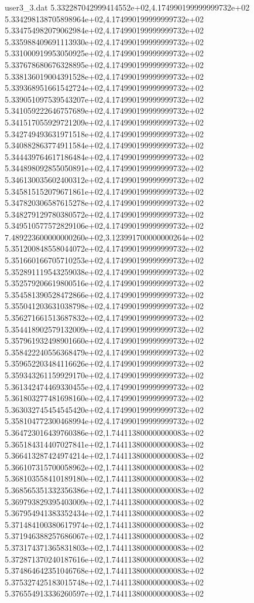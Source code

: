 \begin{filecontents}{user3_3.dat}
5.332287042999414552e+02,4.174990199999999732e+02
5.334298138705898964e+02,4.174990199999999732e+02
5.334754982079062984e+02,4.174990199999999732e+02
5.335988409691113930e+02,4.174990199999999732e+02
5.331000919953050925e+02,4.174990199999999732e+02
5.337678680676328895e+02,4.174990199999999732e+02
5.338136019004391528e+02,4.174990199999999732e+02
5.339368951661542724e+02,4.174990199999999732e+02
5.339051097539543207e+02,4.174990199999999732e+02
5.341059222646757689e+02,4.174990199999999732e+02
5.341517055929721209e+02,4.174990199999999732e+02
5.342749493631971518e+02,4.174990199999999732e+02
5.340882863774911584e+02,4.174990199999999732e+02
5.344439764617186484e+02,4.174990199999999732e+02
5.344898092855050891e+02,4.174990199999999732e+02
5.346130035602400312e+02,4.174990199999999732e+02
5.345815152079671861e+02,4.174990199999999732e+02
5.347820306587615278e+02,4.174990199999999732e+02
5.348279129780380572e+02,4.174990199999999732e+02
5.349510577572829106e+02,4.174990199999999732e+02
7.489223600000000260e+02,3.123991700000000264e+02
5.351200848558044072e+02,4.174990199999999732e+02
5.351660166705710253e+02,4.174990199999999732e+02
5.352891119543259038e+02,4.174990199999999732e+02
5.352579206619800516e+02,4.174990199999999732e+02
5.354581390528472866e+02,4.174990199999999732e+02
5.355041203631038798e+02,4.174990199999999732e+02
5.356271661513687832e+02,4.174990199999999732e+02
5.354418902579132009e+02,4.174990199999999732e+02
5.357961932498901660e+02,4.174990199999999732e+02
5.358422240556368479e+02,4.174990199999999732e+02
5.359652203484116626e+02,4.174990199999999732e+02
5.359343261159929170e+02,4.174990199999999732e+02
5.361342474469330455e+02,4.174990199999999732e+02
5.361803277481698160e+02,4.174990199999999732e+02
5.363032745454545420e+02,4.174990199999999732e+02
5.358104772300468994e+02,4.174990199999999732e+02
5.364723016439760386e+02,1.744113800000000083e+02
5.365184314407027841e+02,1.744113800000000083e+02
5.366413287424974214e+02,1.744113800000000083e+02
5.366107315700058962e+02,1.744113800000000083e+02
5.368103558410189180e+02,1.744113800000000083e+02
5.368565351332356386e+02,1.744113800000000083e+02
5.369793829395403009e+02,1.744113800000000083e+02
5.367954941383352434e+02,1.744113800000000083e+02
5.371484100380617974e+02,1.744113800000000083e+02
5.371946388257686067e+02,1.744113800000000083e+02
5.373174371365831803e+02,1.744113800000000083e+02
5.372871370240187616e+02,1.744113800000000083e+02
5.374864642351046768e+02,1.744113800000000083e+02
5.375327425183015748e+02,1.744113800000000083e+02
5.376554913336260597e+02,1.744113800000000083e+02

\end{filecontents}
